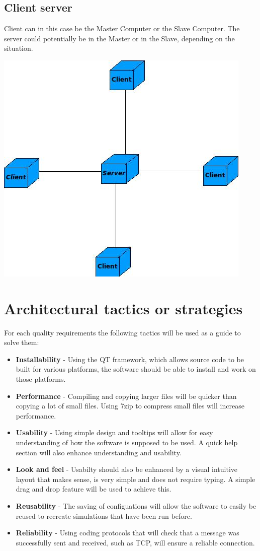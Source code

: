 \documentclass[a4paper,12pt,final]{article}
\begin{document}
\subsection{Client server}
Client can in this case be the Master Computer or the Slave Computer. The server could potentially be in the Master or in the Slave, depending on the situation.
\begin{center}
  	\includegraphics[scale=0.6]{ClientServer.jpeg} 
  \end{center}

\section{Architectural tactics or strategies}
For each quality requirements the following tactics will be used as a guide to solve them:
\begin{itemize}
\item \textbf{Installability} - Using the QT framework, which allows source code to be built for various platforms, the software should be able to install and work on those platforms.
\item \textbf{Performance} - Compiling and copying larger files will be quicker than copying a lot of small files. Using 7zip to compress small files will increase performance.
\item \textbf{Usability} - Using simple design and tooltips will allow for easy understanding of how the software is supposed to be used.  A quick help section will also enhance understanding and usability.
\item \textbf{Look and feel} - Usabilty should also be enhanced by a visual intuitive layout that makes sense, is very simple and does not require typing.  A simple drag and drop feature will be used to achieve this.
\item \textbf{Reusability} - The saving of configuations will allow the software to easily be reused to recreate simulations that have been run before.
\item \textbf{Reliability} - Using coding protocols that will check that a message was successfully sent and received, such as TCP, will ensure a reliable connection.
\end{itemize}
\end{document}
